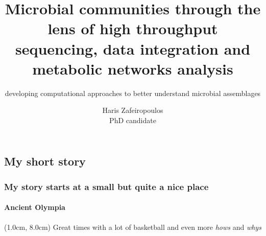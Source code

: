 \documentclass{beamer}
\title{
   Microbial communities through the lens of high throughput sequencing, data integration and metabolic networks analysis
}
\subtitle{
   developing computational approaches to better understand 
   microbial assemblages
}
\author{
   Haris Zafeiropoulos \\ 
   \scriptsize PhD candidate
}
\begin{document}
   \shorthandoff{-}
   \frame[c]{
      \maketitle
   }

   

   \begin{darkframes}
      \section{My short story}
   \end{darkframes}

   \begin{frame}

      \frametitle{
         My story starts at a small but quite a nice place
         }
      \framesubtitle{Ancient Olympia}


      \begin{textblock*}{10cm}(1.0cm, 8.0cm)
         \small Great times with a lot of basketball and even more \textit{hows} and \textit{whys}
      \end{textblock*}

   \end{frame}
\end{document}
